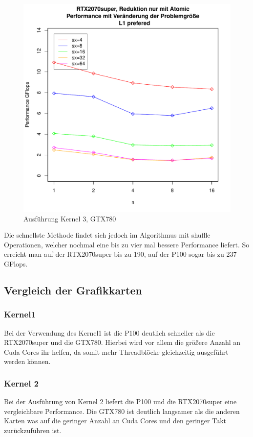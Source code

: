 \documentclass[10pt,a4paper]{article}
\begin{document}
	\begin{figure}
		\includegraphics[page=5,scale=0.8]{../Diagramme/onlyatomic_changei.pdf}
		
		\caption{Ausführung Kernel 3, GTX780 }
		\label{Ausführung Kernel3, GTX780 }
	\end{figure}
	
	
	
	 Die schnellste Methode findet sich jedoch im Algorithmus mit shuffle Operationen, welcher nochmal eine bis zu vier mal bessere Performance liefert. So erreicht man auf der RTX2070super bis zu 190, auf der P100 sogar bis zu 237 GFlops.
	 \subsection{Vergleich der Grafikkarten}
	  \subsubsection{Kernel1}
	  Bei der Verwendung des Kernel1 ist die P100 deutlich schneller als die RTX2070super und die GTX780. Hierbei wird vor allem die größere Anzahl an Cuda Cores ihr helfen, da somit mehr Threadblöcke gleichzeitig ausgeführt werden können.
	  \subsubsection{Kernel 2}
	  Bei der Ausführung von Kernel 2 liefert die P100 und die RTX2070super eine vergleichbare Performance. 
	  Die GTX780 ist deutlich langsamer als die anderen Karten was auf die geringer Anzahl an Cuda Cores und den geringer Takt zurückzuführen ist.
\end{document}
